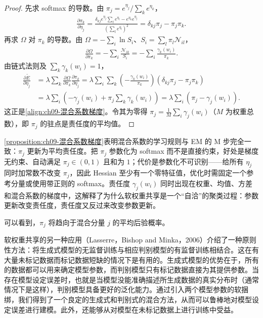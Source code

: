 \documentclass[../../main.tex]{subfiles}
\begin{document}
\begin{proof}
先求 softmax 的导数。由 $\pi_{j}=e^{\eta_{j}}/\sum_{k}e^{\eta_{k}}$，
\begin{align*}
\frac{\partial\pi_{k}}{\partial\eta_{j}}=\frac{\delta_{kj}e^{\eta_{j}}\sum_{l}e^{\eta_{l}}-e^{\eta_{k}}e^{\eta_{j}}}{\left(\sum_{l}e^{\eta_{l}}\right)^{2}}=\delta_{kj}\pi_{j}-\pi_{j}\pi_{k}.
\end{align*}
再求 $\Omega$ 对 $\pi_{k}$ 的导数。由 $\Omega=-\sum_{i}\ln S_{i}$、$S_{i}=\sum_{l}\pi_{l}\mathcal{N}_{il}$，
\begin{align*}
\frac{\partial\Omega}{\partial\pi_{k}}=-\sum_{i}\frac{\mathcal{N}_{ik}}{S_{i}}=-\sum_{i}\frac{\gamma_{k}(w_{i})}{\pi_{k}}.
\end{align*}
由链式法则及 $\sum_{k}\gamma_{k}(w_{i})=1$，
\begin{align*}
\frac{\partial\widetilde{E}}{\partial\eta_{j}}
&=\lambda\sum_{k}\frac{\partial\Omega}{\partial\pi_{k}}\frac{\partial\pi_{k}}{\partial\eta_{j}}
=\lambda\sum_{i}\sum_{k}\left(-\frac{\gamma_{k}(w_{i})}{\pi_{k}}\right)\left(\delta_{kj}\pi_{j}-\pi_{j}\pi_{k}\right)\\
&=\lambda\sum_{i}\left(-\gamma_{j}(w_{i})+\pi_{j}\sum_{k}\gamma_{k}(w_{i})\right)
=\lambda\sum_{i}\left(\pi_{j}-\gamma_{j}(w_{i})\right).
\end{align*}
这正是\eqref{align:ch09-混合系数梯度}。令其为零得 $\pi_{j}=\frac{1}{M}\sum_{i}\gamma_{j}(w_{i})$（$M$ 为权重总数），即 $\pi_{j}$ 的驻点是责任度的平均值。
\end{proof}

\begin{remark}\cref{proposition:ch09-混合系数梯度}表明混合系数的学习规则与 EM 的 M 步完全一致：$\pi_{j}$ 更新为平均责任度。把 $\pi_{j}$ 参数化为 softmax 而不是直接约束，好处是梯度无约束、自动满足 $\pi_{j}\in(0,1)$ 且和为 $1$；代价是参数化不可识别——给所有 $\eta_{j}$ 同时加常数不改变 $\pi_{j}$，因此 Hessian 至少有一个零特征值，优化时需固定一个参考分量或使用带正则的 softmax。责任度 $\gamma_{j}(w_{i})$ 同时出现在权重、均值、方差和混合系数的梯度中，这解释了为什么软权重共享是一个“自洽”的聚类过程：参数更新改变责任度，责任度又反过来改变参数更新。
\end{remark}

可以看到，$\pi_{j}$ 将趋向于混合分量 $j$ 的平均后验概率。

软权重共享的另一种应用（Lasserre，Bishop and Minka，2006）介绍了一种原则性方法：将生成式模型的无监督训练与相应判别模型的有监督训练相结合。这在有大量未标记数据而标记数据短缺的情况下是有用的。生成式模型的优势在于，所有的数据都可以用来确定模型参数，而判别模型只有标记数据直接为其提供参数。当存在模型设定误差时，也就是当模型没能准确描述所生成数据的真实分布时（通常情况下是这样），判别模型具备更好的泛化能力。通过引入两个模型参数的软捆绑，我们得到了一个良定的生成式和判别式的混合方法，从而可以鲁棒地对模型设定误差进行建模。此外，还能够从对模型在未标记数据上进行训练中受益。
\end{document}
